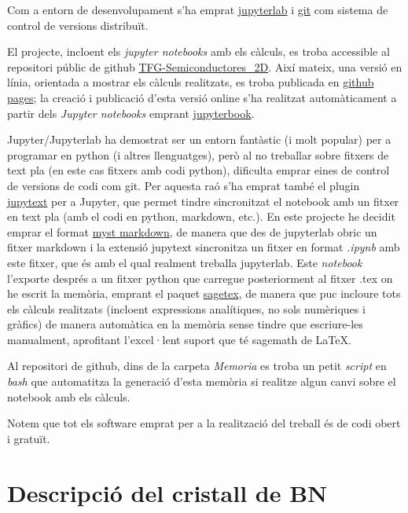 \documentclass[12pt]{article} %
\begin{document}
Com a entorn de desenvolupament s'ha emprat \href{https://jupyter.org/}{jupyterlab} i \href{https://git-scm.com/}{git} com sistema de control de versions distribuït. 

El projecte, incloent els \textit{\foreignlanguage{english}{jupyter notebooks}} amb els càlculs, es troba accessible al repositori públic de github \href{https://github.com/CasimirVictoria/TFG-Semiconductores\_2D}{TFG-Semiconductores\_2D}. Així mateix, una versió en línia, orientada a mostrar els càlculs realitzats, es troba publicada en \href{https://casimirvictoria.github.io/TFG-Semiconductores_2D/index.html}{github pages}; la creació i publicació d'esta versió online s'ha realitzat automàticament a partir dels \textit{Jupyter notebooks} emprant \href{https://jupyterbook.org/intro.html}{jupyterbook}.

Jupyter/Jupyterlab ha demostrat ser un entorn fantàstic (i molt popular) per a programar en python (i altres llenguatges), però al no treballar sobre fitxers de text pla (en este cas fitxers amb codi python), dificulta emprar eines de control de versions de codi com git. Per aquesta raó s’ha emprat també el plugin \href{https://jupytext.readthedocs.io/en/latest/}{jupytext} per a Jupyter, que permet tindre sincronitzat el notebook amb un fitxer en text pla (amb el codi en python, markdown, etc.). En este projecte he decidit emprar el format \href{https://jupyterbook.org/content/myst.html}{myst markdown}, de manera que des de jupyterlab obric un fitxer markdown i la extensió jupytext sincronitza un fitxer en format \textit{.ipynb} amb este fitxer, que és amb el qual realment treballa jupyterlab. Este \emph{notebook} l'exporte després a un fitxer python que carregue posteriorment al fitxer .tex on he escrit la memòria, emprant el paquet \href{https://ctan.org/pkg/sagetex}{sagetex}, de manera que puc incloure tots els càlculs realitzats (incloent expressions analítiques, no sols numèriques i gràfics) de manera automàtica en la memòria sense tindre que escriure-les manualment, aprofitant l'excel·lent suport que té sagemath de \LaTeX . 

Al repositori de github, dins de la carpeta \textit{Memoria} es troba un petit \textit{script} en \textit{bash} que automatitza la generació d'esta memòria si realitze algun canvi sobre el notebook amb els càlculs.

Notem que tot els software emprat per a la realització del treball és de codi obert i gratuït.


\newpage
\section{Descripció del cristall de BN}
\end{document}
